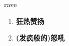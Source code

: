 
\begin{frame}
{\huge rave}
\begin{center}
\begin{enumerate}\Large
  \item \textbf{狂热赞扬}
  \item \textbf{(发疯般的)怒吼}
\end{enumerate}
\end{center}
\end{frame}
